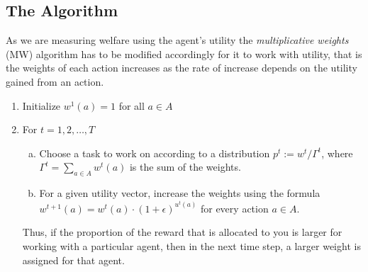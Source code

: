 \documentclass[a4paper,10pt]{article}
\theoremstyle{definition}
\begin{document}
\subsection*{The Algorithm}
As we are measuring welfare using the agent's utility the \emph{multiplicative weights} (MW) algorithm has to be modified accordingly for it to work with utility, that is the weights of each action increases as the rate of increase depends on the utility gained from an action.
\begin{enumerate}[1.]
\item Initialize $w^1(a)=1$ for all $a \in A$
\item For $t=1,2,\ldots,T$
\begin{enumerate}[(a)]
\item Choose a task to work on according to a distribution $p^t:=w^t/\Gamma^t$, where $\Gamma^t=\sum_{a\in A}w^t(a)$ is the sum of the weights.
\item For a given utility vector, increase the weights using the formula $w^{t+1}(a)=w^t(a)\cdot (1+\epsilon)^{u^t(a)}$ for every action $a \in A$.
\end{enumerate}
Thus, if the proportion of the reward that is allocated to you is larger for working with a particular agent, then in the next time step, a larger weight is assigned for that agent.
\end{enumerate}






















































 

\end{document}

